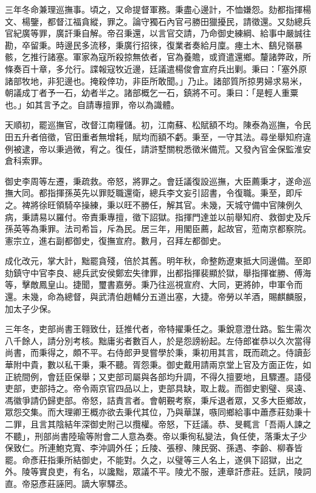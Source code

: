 \begin{pinyinscope}
三年冬命兼理巡撫事。頃之，又命提督軍務。秉盡心邊計，不恤嫌怨。劾都指揮楊文、楊鑒，都督江福貪縱，罪之。論守獨石內官弓勝田獵擾民，請徵還。又劾總兵官紀廣等罪，廣訐秉自解。帝召秉還，以言官交請，乃命御史練綱、給事中嚴誠往勘，卒留秉。時邊民多流移，秉廣行招徠，復業者奏給月廩。瘞土木、鷂兒嶺暴骸，乞推行諸塞。軍家為寇所殺掠無依者，官為養贍，或資遣還鄉。釐諸弊政，所條奏百十章，多允行。諜報寇牧近邊，廷議遣楊俊會宣府兵出剿。秉曰：「塞外原諸部牧地，非犯邊也。掩殺倖功，非臣所敢聞。」乃止。諸部質所掠男婦求易米，朝議成丁者予一石，幼者半之。諸部概乞一石，鎮將不可。秉曰：「是輕人重粟也。」如其言予之。自請專擅罪，帝以為識體。

天順初，罷巡撫官，改督江南糧儲。初，江南蘇、松賦額不均。陳泰為巡撫，令民田五升者倍徵，官田重者無增耗，賦均而額不虧。秉至，一守其法。尋坐舉知府違例被逮，帝以秉過微，宥之。復任，請滸墅關稅悉徵米備荒。又發內官金保監淮安倉科索罪。

御史李周等左遷，秉疏救。帝怒，將罪之。會廷議復設巡撫，大臣薦秉才，遂命巡撫大同。都指揮孫英先以罪貶職還衛，總兵李文妄引詔書，令復職。秉至，即斥之。裨將徐旺領騎卒操練，秉以旺不勝任，解其官。未幾，天城守備中官陳例久病，秉請易以羅付。帝責秉專擅，徵下詔獄。指揮門達並以前舉知府、救御史及斥孫英等為秉罪。法司希旨，斥為民。居三年，用閣臣薦，起故官，蒞南京都察院。憲宗立，進右副都御史，復撫宣府。數月，召拜左都御史。

成化改元，掌大計，黜罷貪殘，倍於其舊。明年秋，命整飭遼東抵大同邊備。至即劾鎮守中官李良、總兵武安侯鄭宏失律罪，出都指揮裴顯於獄，舉指揮崔勝、傅海等，擊敵鳳皇山。捷聞，璽書嘉勞。秉乃往巡視宣府、大同，更將帥，申軍令而還。未幾，命為總督，與武清伯趙輔分五道出塞，大捷。帝勞以羊酒，賜麒麟服，加太子少保。

三年冬，吏部尚書王翱致仕，廷推代者，帝特擢秉任之。秉銳意澄仕路。監生需次八千餘人，請分別考核。黜庸劣者數百人，於是怨謗紛起。左侍郎崔恭以久次當得尚書，而秉得之，頗不平。右侍郎尹旻嘗學於秉，秉初用其言，既而疏之。侍讀彭華附中貴，數以私干秉，秉不聽。胥怨秉。御史戴用請兩京堂上官及方面正佐，如正統間例，會廷臣保舉；又吏部司屬與各部均升調，不得久擅要地，且驟遷。語侵吏部，吏部持之。帝令兩京官四品以上，吏部具缺，取上裁。而御史劉璧、吳遠、馮徽爭請仍歸吏部。帝怒，詰責言者。會朝覲考察，秉斥退者眾，又多大臣鄉故，眾怨交集。而大理卿王概亦欲去秉代其位，乃與華謀，嗾同鄉給事中蕭彥莊劾秉十二罪，且言其陰結年深御史附己以攬權。帝怒，下廷議。恭、旻輒言「吾兩人諫之不聽」，刑部尚書陸瑜等附會二人意為奏。帝以秉徇私變法，負任使，落秉太子少保致仁。所連鮑克寬、李沖調外任；丘陵、張穆、陳民弼、孫遇、李齡、柳春皆罷。命彥莊指秉所結御史，不能對。久之，以璧等三人名上，遂俱下詔獄，出之外。陵等實良吏，有名，以讒黜，眾議不平。陵尤不服，連章訐彥莊。廷訊，陵詞直。帝惡彥莊誣罔。謫大寧驛丞。


\end{pinyinscope}
